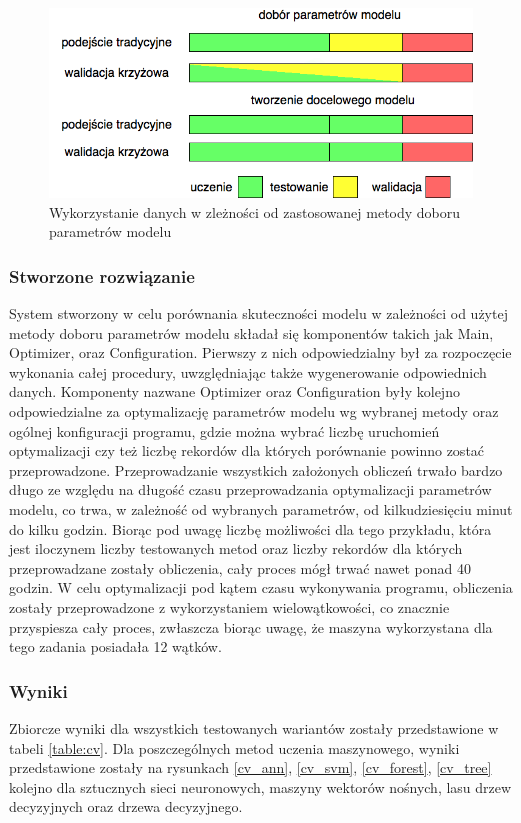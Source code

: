 \begin{figure}[ht!]
\centering
\includegraphics[scale=0.6]{res/cvdata.png}
\caption[Caption for LOF]{Wykorzystanie danych w zleżności od zastosowanej metody doboru parametrów modelu\label{cvdata}}
\end{figure} 

\subsubsection{Stworzone rozwiązanie}
System stworzony w celu porównania skuteczności modelu w zależności od użytej metody doboru parametrów modelu składał się komponentów takich jak Main, Optimizer, oraz Configuration. Pierwszy z nich odpowiedzialny był za rozpoczęcie wykonania całej procedury, uwzględniając także wygenerowanie odpowiednich danych. Komponenty nazwane Optimizer oraz Configuration były kolejno odpowiedzialne za optymalizację parametrów modelu wg wybranej metody oraz ogólnej konfiguracji programu, gdzie można wybrać liczbę uruchomień optymalizacji czy też liczbę rekordów dla których porównanie powinno zostać przeprowadzone. Przeprowadzanie wszystkich założonych obliczeń trwało bardzo długo ze względu na długość czasu przeprowadzania optymalizacji parametrów modelu, co trwa, w zależność od wybranych parametrów, od kilkudziesięciu minut do kilku godzin. Biorąc pod uwagę liczbę możliwości dla tego przykładu, która jest iloczynem liczby testowanych metod oraz liczby rekordów dla których przeprowadzane zostały obliczenia, cały proces mógł trwać nawet ponad 40 godzin. W celu optymalizacji pod kątem czasu wykonywania programu, obliczenia zostały przeprowadzone z wykorzystaniem wielowątkowości, co znacznie przyspiesza cały proces, zwłaszcza biorąc uwagę, że maszyna wykorzystana dla tego zadania posiadała 12 wątków. 
 
\subsubsection{Wyniki}
Zbiorcze wyniki dla wszystkich testowanych wariantów zostały przedstawione w tabeli \ref{table:cv}. Dla poszczególnych metod uczenia maszynowego, wyniki przedstawione zostały na rysunkach \ref{cv_ann}, \ref{cv_svm}, \ref{cv_forest}, \ref{cv_tree} kolejno dla sztucznych sieci neuronowych, maszyny wektorów nośnych, lasu drzew decyzyjnych oraz drzewa decyzyjnego.


